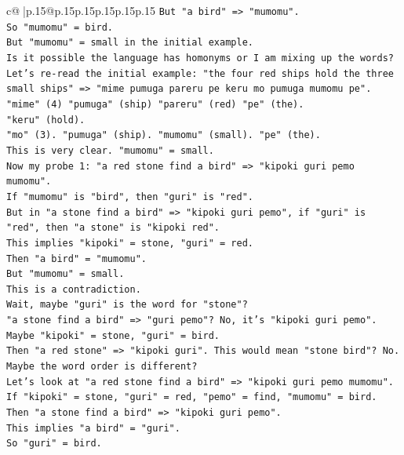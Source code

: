 \documentclass{article}
\begin{document}
{\begin{supertabular}{c@{$\;$}|p{.15\linewidth}@{}p{.15\linewidth}p{.15\linewidth}p{.15\linewidth}p{.15\linewidth}p{.15\linewidth}}
{{{\texttt{But "a bird" => "mumomu".} \\
\texttt{So "mumomu" = bird.} \\
\texttt{But "mumomu" = small in the initial example.} \\
\texttt{Is it possible the language has homonyms or I am mixing up the words?} \\
\texttt{Let's re{-}read the initial example: "the four red ships hold the three small ships" => "mime pumuga pareru pe keru mo pumuga mumomu pe".} \\
\texttt{"mime" (4) "pumuga" (ship) "pareru" (red) "pe" (the).} \\
\texttt{"keru" (hold).} \\
\texttt{"mo" (3). "pumuga" (ship). "mumomu" (small). "pe" (the).} \\
\texttt{This is very clear. "mumomu" = small.} \\
\texttt{Now my probe 1: "a red stone find a bird" => "kipoki guri pemo mumomu".} \\
\texttt{If "mumomu" is "bird", then "guri" is "red".} \\
\texttt{But in "a stone find a bird" => "kipoki guri pemo", if "guri" is "red", then "a stone" is "kipoki red".} \\
\texttt{This implies "kipoki" = stone, "guri" = red.} \\
\texttt{Then "a bird" = "mumomu".} \\
\texttt{But "mumomu" = small.} \\
\texttt{This is a contradiction.} \\
\texttt{Wait, maybe "guri" is the word for "stone"?} \\
\texttt{"a stone find a bird" => "guri pemo"? No, it's "kipoki guri pemo".} \\
\texttt{Maybe "kipoki" = stone, "guri" = bird.} \\
\texttt{Then "a red stone" => "kipoki guri". This would mean "stone bird"? No.} \\
\texttt{Maybe the word order is different?} \\
\texttt{Let's look at "a red stone find a bird" => "kipoki guri pemo mumomu".} \\
\texttt{If "kipoki" = stone, "guri" = red, "pemo" = find, "mumomu" = bird.} \\
\texttt{Then "a stone find a bird" => "kipoki guri pemo".} \\
\texttt{This implies "a bird" = "guri".} \\
\texttt{So "guri" = bird.} \\
}}}
\end{supertabular}}
\end{document}
